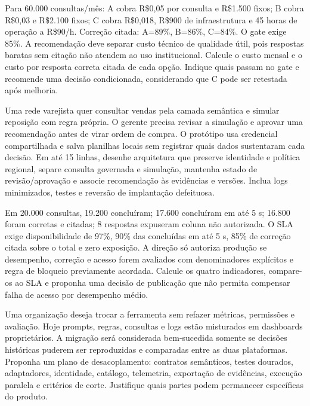 \TextoBase
Para 60.000 consultas/mês: A cobra R\$0,05 por consulta e R\$1.500 fixos; B cobra R\$0,03 e R\$2.100 fixos; C cobra R\$0,018, R\$900 de infraestrutura e 45 horas de operação a R\$90/h. Correção citada: A=89\%, B=86\%, C=84\%. O gate exige 85\%.
A recomendação deve separar custo técnico de qualidade útil, pois respostas baratas sem citação não atendem ao uso institucional.
\FonteDidatica
\Comando Calcule o custo mensal e o custo por resposta correta citada de cada opção. Indique quais passam no gate e recomende uma decisão condicionada, considerando que C pode ser retestada após melhoria.

\TextoBase
Uma rede varejista quer consultar vendas pela camada semântica e simular reposição com regra própria. O gerente precisa revisar a simulação e aprovar uma recomendação antes de virar ordem de compra. O protótipo usa credencial compartilhada e salva planilhas locais sem registrar quais dados sustentaram cada decisão.
\FonteDidatica
\Comando Em até 15 linhas, desenhe arquitetura que preserve identidade e política regional, separe consulta governada e simulação, mantenha estado de revisão/aprovação e associe recomendação às evidências e versões. Inclua logs minimizados, testes e reversão de implantação defeituosa.

\TextoBase
Em 20.000 consultas, 19.200 concluíram; 17.600 concluíram em até 5 s; 16.800 foram corretas e citadas; 8 respostas expuseram coluna não autorizada. O SLA exige disponibilidade de 97\%, 90\% das concluídas em até 5 s, 85\% de correção citada sobre o total e zero exposição.
A direção só autoriza produção se desempenho, correção e acesso forem avaliados com denominadores explícitos e regra de bloqueio previamente acordada.
\FonteDidatica
\Comando Calcule os quatro indicadores, compare-os ao SLA e proponha uma decisão de publicação que não permita compensar falha de acesso por desempenho médio.

\TextoBase
Uma organização deseja trocar a ferramenta sem refazer métricas, permissões e avaliação. Hoje prompts, regras, consultas e logs estão misturados em dashboards proprietários.
A migração será considerada bem-sucedida somente se decisões históricas puderem ser reproduzidas e comparadas entre as duas plataformas.
\FonteDidatica
\Comando Proponha um plano de desacoplamento: contratos semânticos, testes dourados, adaptadores, identidade, catálogo, telemetria, exportação de evidências, execução paralela e critérios de corte. Justifique quais partes podem permanecer específicas do produto.

